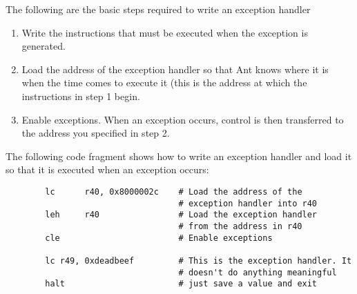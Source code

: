 The following are the basic steps required to write an exception handler

\begin{enumerate}

\item Write the instructions that must be executed when the
  exception is generated. 
\item Load the address of the exception handler so that Ant 
  knows where it is when the time comes to execute it (this is 
  the address at which the instructions in step 1 begin.
\item Enable exceptions. When an exception occurs, control
  is then transferred to the address you specified in step 2.

\end{enumerate}

The following code fragment shows how to write an exception handler
and load it so that it is executed when an exception occurs:

{\small
\begin{verbatim}
        lc      r40, 0x8000002c    # Load the address of the 
                                   # exception handler into r40
        leh     r40                # Load the exception handler 
                                   # from the address in r40 
        cle                        # Enable exceptions

        lc r49, 0xdeadbeef         # This is the exception handler. It 
                                   # doesn't do anything meaningful
        halt                       # just save a value and exit
\end{verbatim}}


